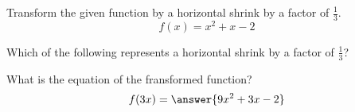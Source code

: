 \documentclass{ximera}
\author{Ivo Terek}
\begin{document}
Transform the given function by a horizontal shrink by a factor of $\frac{1}{3}$.
\[
f(x)=x^2+x-2
\]
\begin{exercise}
Which of the following represents a horizontal shrink by a factor of $\frac{1}{3}$?
\begin{multipleChoice}
\end{multipleChoice}
\end{exercise}
\begin{exercise}
What is the equation of the fransformed function?
\[
f(3x)=\answer{9x^2+3x-2}
\]
\end{exercise}
\end{document}
